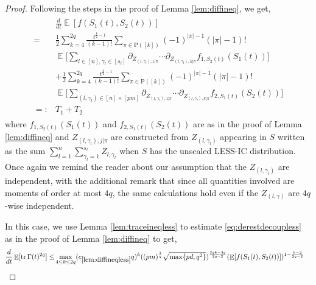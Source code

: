 \documentclass[11pt]{amsart}
\numberwithin{equation}{section}
\numberwithin{equation}{section}
\DeclareMathOperator{\E}{\mathbb{E}}
\DeclareMathOperator*{\tr}{tr}
\theoremstyle{remark}
\theoremstyle{definition}
\begin{document}
\begin{proof}
    Following the steps in the proof of Lemma \ref{lem:diffineq}, we get,
    \begin{align}
\begin{split} \label{eq:derestdecoupless} 
	&\frac{d}{dt}\E[f(S_1(t),S_2(t))]
 \\=& 	\frac{1}{2}\sum_{k=4}^{2q}
	\frac{t^{\frac{k}{2}-1}}{(k-1)!}
	\sum_{\pi\in\mathrm{P}([k])}
	(-1)^{|\pi|-1}(|\pi|-1)!\,
	\\&\E\Bigg[ \sum_{l \in [n], \gamma_l \in [s_l]} \partial_{Z_{(l,\gamma_l),1|\pi}}\cdots\partial_{Z_{(l,\gamma_l ),k|\pi}}f_{1,S_2(t)}(S_1(t))
	\Bigg]\\&+\frac{1}{2}\sum_{k=4}^{2q}
	\frac{t^{\frac{k}{2}-1}}{(k-1)!}
	\sum_{\pi\in\mathrm{P}([k])}
	(-1)^{|\pi|-1}(|\pi|-1)!\,
	\\&\E\Bigg[ \sum_{(l,\gamma_l) \in [n] \times [pm]} \partial_{Z_{(l,\gamma_l),1|\pi}}\cdots\partial_{Z_{(l,\gamma_l),k|\pi}}f_{2,S_1(t)}(S_2(t))
	\Bigg]\\=:& T_1 + T_2
 \end{split}
\end{align}
where $f_{1,S_2(t)}(S_1(t))$ and $f_{2,S_1(t)}(S_2(t))$ are as in the proof of Lemma \ref{lem:diffineq} and $Z_{(l,\gamma_l),j|\pi}$ are constructed from $Z_{(l,\gamma_l)}$ appearing in $S$ written as the sum $\sum_{l=1}^n \sum_{\gamma_l =1}^{s_l} Z_{l,\gamma_l}$ when $S$ has the unscaled LESS-IC distribution. Once again we remind the reader about our assumption that the $Z_{(l,\gamma_l)}$ are independent, with the additional remark that since all quantities involved are moments of order at most $4q$, the same calculations hold even if the $Z_{(l,\gamma)}$ are $4q$-wise independent.

In this case, we use Lemma \ref{lem:traceineqless} to estimate \eqref{eq:derestdecoupless} as in the proof of Lemma \ref{lem:diffineq} to get,
\begin{align*}
    \frac{d}{dt}\E[\tr \Gamma(t)^{2q}] \le&  \max \limits_{4 \le k \le 2q} (c_{\ref*{lem:diffineqless}}q)^k ((pm)^\frac{1}{q}\sqrt{\max\{ pd,q^2 \}})^{\frac{2qk-4q}{2q-2}}(\E[f(S_1(t),S_2(t))])^{1-\frac{k-2}{2q-2}}
\end{align*}
\end{proof}
\end{document}
